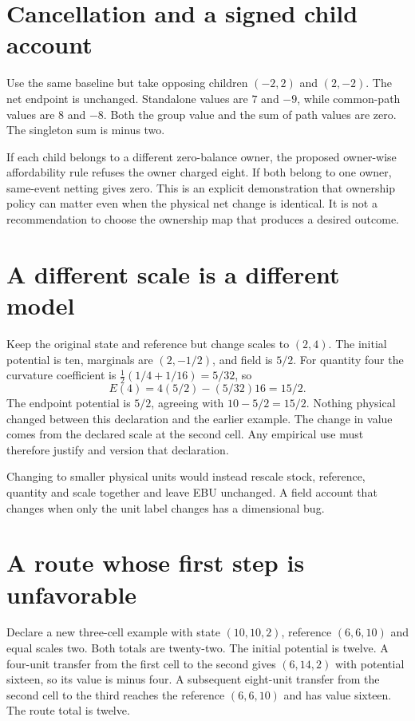 \section{Cancellation and a signed child account}
Use the same baseline but take opposing children $(-2,2)$ and $(2,-2)$.
The net endpoint is unchanged. Standalone values are $7$ and $-9$,
while common-path values are $8$ and $-8$. Both the group value and the
sum of path values are zero. The singleton sum is minus two.

If each child belongs to a different zero-balance owner, the proposed
owner-wise affordability rule refuses the owner charged eight. If both
belong to one owner, same-event netting gives zero. This is an explicit
demonstration that ownership policy can matter even when the physical net
change is identical. It is not a recommendation to choose the ownership
map that produces a desired outcome.

\section{A different scale is a different model}
Keep the original state and reference but change scales to $(2,4)$.
The initial potential is ten, marginals are $(2,-1/2)$, and field is
$5/2$. For quantity four the curvature coefficient is
$\tfrac12(1/4+1/16)=5/32$, so
\begin{equation}
 E(4)=4(5/2)-(5/32)16=15/2.
\end{equation}
The endpoint potential is $5/2$, agreeing with $10-5/2=15/2$.
Nothing physical changed between this declaration and the earlier example.
The change in value comes from the declared scale at the second cell.
Any empirical use must therefore justify and version that declaration.

Changing to smaller physical units would instead rescale stock, reference,
quantity and scale together and leave EBU unchanged. A field account that
changes when only the unit label changes has a dimensional bug.

\section{A route whose first step is unfavorable}
Declare a new three-cell example with state $(10,10,2)$, reference
$(6,6,10)$ and equal scales two. Both totals are twenty-two. The initial
potential is twelve. A four-unit transfer from the first cell to the
second gives $(6,14,2)$ with potential sixteen, so its value is minus four.
A subsequent eight-unit transfer from the second cell to the third reaches
the reference $(6,6,10)$ and has value sixteen. The route total is twelve.


